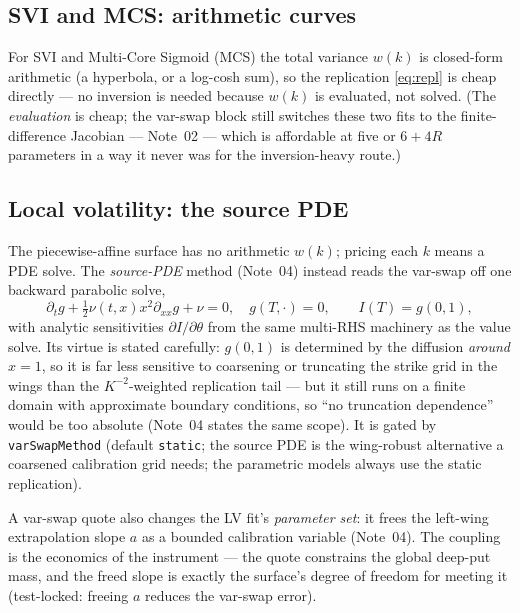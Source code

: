 \documentclass[11pt]{article}
\begin{document}
\subsection{SVI and MCS: arithmetic curves}

For SVI and Multi-Core Sigmoid (MCS) the total variance $w(k)$ is closed-form arithmetic
(a hyperbola, or a log-cosh sum), so the replication \eqref{eq:repl} is cheap
directly --- no inversion is needed because $w(k)$ is evaluated, not solved.
(The \emph{evaluation} is cheap; the var-swap block still switches these two
fits to the finite-difference Jacobian --- Note~02 --- which is affordable at
five or $6+4R$ parameters in a way it never was for the inversion-heavy
route.)

\subsection{Local volatility: the source PDE}

The piecewise-affine surface has no arithmetic $w(k)$; pricing each $k$ means a PDE
solve. The \emph{source-PDE} method (Note~04) instead reads the var-swap off one
backward parabolic solve,
\begin{equation}
\partial_t g+\tfrac12\nu(t,x)x^2\partial_{xx}g+\nu=0,\quad g(T,\cdot)=0,
\qquad I(T)=g(0,1),
\label{eq:source_pde}
\end{equation}
with analytic sensitivities $\partial I/\partial\theta$ from the same multi-RHS
machinery as the value solve. Its virtue is stated carefully: $g(0,1)$ is
determined by the diffusion \emph{around} $x=1$, so it is far less sensitive
to coarsening or truncating the strike grid in the wings than the
$K^{-2}$-weighted replication tail --- but it still runs on a finite domain
with approximate boundary conditions, so ``no truncation dependence'' would
be too absolute (Note~04 states the same scope). It is gated by
\texttt{varSwapMethod} (default \texttt{static}; the source PDE is the
wing-robust alternative a coarsened calibration grid needs; the parametric
models always use the static replication).

A var-swap quote also changes the LV fit's \emph{parameter set}: it frees
the left-wing extrapolation slope $a$ as a bounded calibration variable
(Note~04). The coupling is the economics of the instrument --- the quote
constrains the global deep-put mass, and the freed slope is exactly the
surface's degree of freedom for meeting it (test-locked: freeing $a$
reduces the var-swap error).
\end{document}
